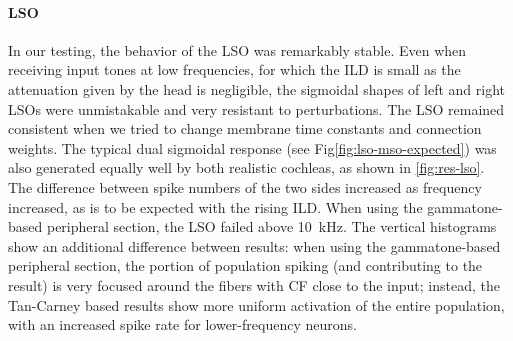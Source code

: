 \documentclass[11pt,a4paper,twocolumn]{article}
\begin{document}
\paragraph{LSO}
In our testing, the behavior of the LSO was remarkably stable. Even when receiving input tones at low frequencies, for which the ILD is small as the attenuation given by the head is negligible, the sigmoidal shapes of left and right LSOs were unmistakable and very resistant to perturbations. The LSO remained consistent when we tried to change membrane time constants and connection weights. The typical dual sigmoidal response (see Fig\ref{fig:lso-mso-expected}) was also generated equally well by both realistic cochleas, as shown in \ref{fig:res-lso}. The difference between spike numbers of the two sides increased as frequency increased, as is to be expected with the rising ILD. When using the gammatone-based peripheral section, the LSO failed above \qty{10}{\kilo\hertz}. The vertical histograms show an additional difference between results: when using the gammatone-based peripheral section, the portion of population spiking (and contributing to the result) is very focused around the fibers with CF close to the input; instead, the Tan-Carney based results show more uniform activation of the entire population, with an increased spike rate for lower-frequency neurons.
\end{document}
